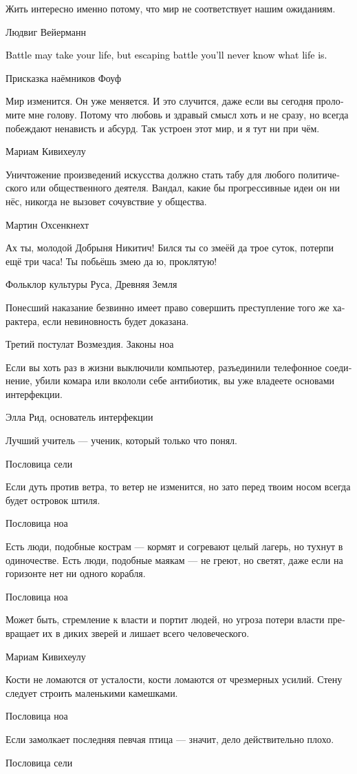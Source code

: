 \documentclass[a4paper,12pt,fleqn]{book}\usepackage{cooltooltips}\usepackage{polyglossia}\setdefaultlanguage[babelshorthands=true]{russian}\setotherlanguage{english}\defaultfontfeatures{Ligatures=TeX,Mapping=tex-text} \usepackage{xcolor}\definecolor{lightgray}{HTML}{bbbbbb}\color{lightgray}\newcommand{\ml}[3]{\textenglish{\textcolor{black}{#3}}}
\begin{document}
{\epigraph
{Жить интересно именно потому, что мир не соответствует нашим ожиданиям.}
{Людвиг Вейерманн}

\epigraph{
\ml{$0$}
{Битва может стоить жизни, но без битвы ты не узнаешь, что такое жизнь.}
{Battle may take your life, but escaping battle you'll never know what life is.}
}{Присказка наёмников Фоуф}

\epigraph
{Мир изменится.
Он уже меняется.
И это случится, даже если вы сегодня проломите мне голову.
Потому что любовь и здравый смысл хоть и не сразу, но всегда побеждают ненависть и абсурд.
Так устроен этот мир, и я тут ни при чём.}
{Мариам Кивихеулу}

\epigraph
{Уничтожение произведений искусства должно стать табу для любого политического или общественного деятеля.
Вандал, какие бы прогрессивные идеи он ни нёс, никогда не вызовет сочувствие у общества.}
{Мартин Охсенкнехт}

\epigraph
{Ах ты, молодой Добрыня Никитич!
Бился ты со змеёй да трое суток, потерпи ещё три часа!
Ты побьёшь змею да ю, проклятую!}
{Фольклор культуры Руса, Древняя Земля}

\epigraph
{Понесший наказание безвинно имеет право совершить преступление того же характера, если невиновность будет доказана.}
{Третий постулат Возмездия.
Законы ноа}

\epigraph
{Если вы хоть раз в жизни выключили компьютер, разъединили телефонное соединение, убили комара или вкололи себе антибиотик, вы уже владеете основами интерфекции.}
{Элла Рид, основатель интерфекции}

\epigraph
{Лучший учитель --- ученик, который только что понял.}
{Пословица сели}

\epigraph
{Если дуть против ветра, то ветер не изменится, но зато перед твоим носом всегда будет островок штиля.}
{Пословица ноа}

\epigraph
{Есть люди, подобные кострам --- кормят и согревают целый лагерь, но тухнут в одиночестве.
Есть люди, подобные маякам --- не греют, но светят, даже если на горизонте нет ни одного корабля.}
{Пословица ноа}

\epigraph
{Может быть, стремление к власти и портит людей, но угроза потери власти превращает их в диких зверей и лишает всего человеческого.}
{Мариам Кивихеулу}

\epigraph
{Кости не ломаются от усталости, кости ломаются от чрезмерных усилий.
Стену следует строить маленькими камешками.}
{Пословица ноа}

\epigraph
{Если замолкает последняя певчая птица --- значит, дело действительно плохо.}
{Пословица сели}

}
\end{document}
